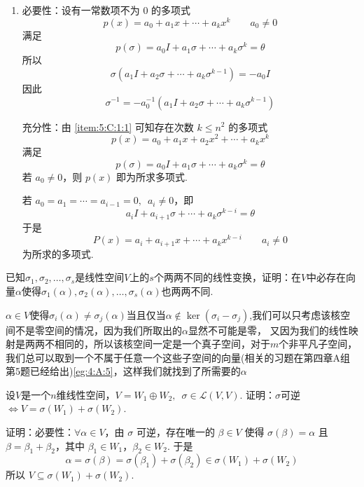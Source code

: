 \begin{exercise}
\begin{exgroup}
\begin{answer}
\begin{enumerate}
                \item 必要性：设有一常数项不为 0 的多项式
                      \[ p(x) = a_0 + a_1 x + \cdots + a_k x^k \qquad a_0 \neq 0 \]
                      满足
                      \[ p(\sigma) = a_0 I + a_1 \sigma + \cdots + a_k \sigma^k = \theta \]
                      所以
                      \[ \sigma(a_1 I + a_2 \sigma + \cdots + a_k \sigma^{k - 1}) = -a_0 I \]
                      因此
                      \[ \sigma^{-1} = -a_0^{-1} (a_1 I + a_2 \sigma + \cdots + a_k \sigma^{k - 1}) \]

                      充分性：由 \ref*{item:5:C:1:1} 可知存在次数 $ k \leqslant n^2 $ 的多项式
                      \[ p(x) = a_0 + a_1 x + a_2 x^2 + \cdots + a_k x^k \]
                      满足
                      \[ p(\sigma) = a_0 I + a_1 \sigma + \cdots + a_k \sigma^k = \theta \]
                      若 $ a_0 \neq 0 $，则 $ p(x) $ 即为所求多项式.

                      若 $ a_0 = a_1 = \cdots = a_{i - 1} = 0,\enspace a_i \neq 0 $，即
                      \[ a_i I + a_{i + 1} \sigma + \cdots + a_k \sigma^{k - i} = \theta \]
                      于是
                      \[ P(x) = a_i + a_{i + 1} x + \cdots + a_k x^{k - i} \qquad a_i \neq 0 \]
                      为所求的多项式.
            \end{enumerate}
        \end{answer}
        \item 已知$\sigma_1,\sigma_2,\ldots,\sigma_s$是线性空间$V$上的$s$个两两不同的线性变换，证明：在$V$中必存在向量$\alpha$使得$\sigma_1(\alpha),\sigma_2(\alpha),\ldots,\sigma_s(\alpha)$也两两不同.
        \begin{answer}
            $\alpha \in V$使得$\sigma_i(\alpha) \neq \sigma_j(\alpha)$当且仅当$\alpha \notin \ker(\sigma_i - \sigma_j)$,我们可以只考虑该核空间不是零空间的情况，因为我们所取出的$\alpha$显然不可能是零，
            又因为我们的线性映射是两两不相同的，所以该核空间一定是一个真子空间，对于$m$个非平凡子空间，我们总可以取到一个不属于任意一个这些子空间的向量(相关的习题在第四章A组第5题已经给出)\autoref{eg:4:A:5}，这样我们就找到了所需要的$\alpha$
        \end{answer}
        \item 设$V$是一个$n$维线性空间，$V=W_1\oplus W_2,\enspace\sigma\in \mathcal{L}(V,V)$. 证明：$\sigma$可逆$\iff V=\sigma(W_1)+\sigma(W_2)$.
        \begin{answer}
            证明：必要性：$ \forall \alpha \in V $，由 $ \sigma $ 可逆，存在唯一的 $ \beta \in V $ 使得 $ \sigma(\beta) = \alpha $ 且 $ \beta = \beta_1 + \beta_2 $，其中 $ \beta_1 \in W_1 $，$ \beta_2 \in W_2 $. 于是
          \[ \alpha = \sigma(\beta) = \sigma(\beta_1) + \sigma(\beta_2) \in \sigma(W_1) + \sigma(W_2) \]
          所以 $ V \subseteq \sigma(W_1) + \sigma(W_2) $.


\end{answer}
\end{exgroup}
\end{exercise}
